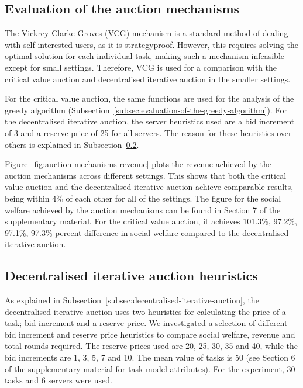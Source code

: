 \subsection{Evaluation of the auction mechanisms}
\label{subsec:evaluation-of-the-auction-mechanisms}
The Vickrey-Clarke-Groves (VCG) mechanism \cite{vickrey,Clarke,groves} is a standard method of dealing with self-interested users, as it is strategyproof. However, this requires solving the optimal solution for each individual task, making such a mechanism infeasible except for small settings. Therefore, VCG is used for a comparison with the critical value auction and decentralised iterative auction in the smaller settings.

For the critical value auction, the same functions are used for the analysis of the greedy algorithm (Subsection~\ref{subsec:evaluation-of-the-greedy-algorithm}). For the decentralised iterative auction, the server heuristics used are a bid increment of 3 and a reserve price of 25 for all servers. The reason for these heuristics over others is explained in Subsection~\ref{subsec:decentralised-iterative-auction-heuristics}.

Figure~\ref{fig:auction-mechanisms-revenue} plots the revenue achieved by the auction mechanisms across different settings. This shows that both the critical value auction and the decentralised iterative auction achieve comparable results, being within 4\% of each other for all of the settings. The figure for the social welfare achieved by the auction mechanisms can be found in Section 7 of the supplementary material. For the critical value auction, it achieves 101.3\%, 97.2\%, 97.1\%, 97.3\% percent difference in social welfare compared to the decentralised iterative auction.

\subsection{Decentralised iterative auction heuristics}
\label{subsec:decentralised-iterative-auction-heuristics}
As explained in Subsection~\ref{subsec:decentralised-iterative-auction}, the decentralised iterative auction uses two heuristics for calculating the price of a task; bid increment and a reserve price. We investigated a selection of different bid increment and reserve price heuristics to compare social welfare, revenue and total rounds required. The reserve prices used are 20, 25, 30, 35 and 40, while the bid increments are 1, 3, 5, 7 and 10. The mean value of tasks is 50 (see Section 6 of the supplementary material for task model attributes). For the experiment, 30 tasks and 6 servers were used.

